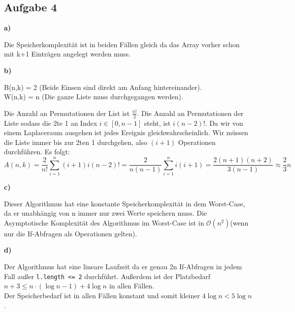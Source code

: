 \documentclass[a4paper,graphics,11pt]{article}
\newcommand{\aufgabe}[1]{\subsection*{Aufgabe #1}}
\begin{document}
\aufgabe{4}
\textbf{a)}

Die Speicherkomplexität ist in beiden Fällen gleich da das Array vorher schon mit k+1 Einträgen angelegt werden muss.

\textbf{b)}

B(n,k) = 2 \quad (Beide Einsen sind direkt am Anfang hintereinander).\\
W(n,k) = n  \quad (Die ganze Liste muss durchgegangen werden).

Die Anzahl an Permutationen der List ist $\frac{n!}{2}$.
Die Anzahl an Permutationen der Liste sodass die 2te 1 an Index $i \in [0, n-1]$ steht, ist
$i(n - 2)!$. Da wir von einem Laplaceraum ausgehen ist jedes Ereignis gleichwahrscheinlich. Wir müssen die Liste
immer bis zur 2ten 1 durchgehen, also $(i+1)$ Operationen durchführen. Es folgt:
$$
    A(n,k) = \frac{2}{n!}\sum_{i=1}^{n}(i+1) i(n-2)!
    = \frac{2}{n(n-1)} \sum_{i=1}^{n} i(i+1)
    = \frac{2(n+1)(n+2)}{3(n-1)} \approx \frac{2}{3}n
$$

\textbf{c)}



Dieser Algorithmus hat eine konstante Speicherkomplexität in dem Worst-Case, da er unabhängig von n immer nur zwei Werte speichern muss.
Die Asymptotische Komplexität des Algorithmus im Worst-Case ist in $\mathcal{O}(n^2)$(wenn nur die If-Abfragen als Operationen gelten).
\newpage

\textbf{d)}


Der Algorithmus hat eine lineare Laufzeit da er genau 2n If-Abfragen in jedem Fall außer \texttt{l.length <= 2} durchführt.
Außerdem ist der Platzbedarf $n + 3 \le n\cdot(\log n-1 )+ 4\log n$ in allen Fällen.\\[50pt]



Der Speicherbedarf ist in allen Fällen konstant und somit kleiner $4\log n < 5 \log n$.
 
\end{document}
